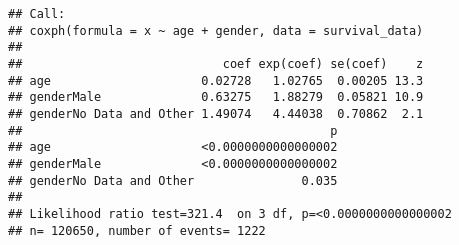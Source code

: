 \documentclass[]{article}
\newenvironment{Shaded}{\begin{snugshade}}{\end{snugshade}}
\newcommand{\KeywordTok}[1]{\textcolor[rgb]{0.13,0.29,0.53}{\textbf{#1}}}
\newcommand{\DataTypeTok}[1]{\textcolor[rgb]{0.13,0.29,0.53}{#1}}
\newcommand{\StringTok}[1]{\textcolor[rgb]{0.31,0.60,0.02}{#1}}
\newcommand{\CommentTok}[1]{\textcolor[rgb]{0.56,0.35,0.01}{\textit{#1}}}
\newcommand{\ControlFlowTok}[1]{\textcolor[rgb]{0.13,0.29,0.53}{\textbf{#1}}}
\newcommand{\OperatorTok}[1]{\textcolor[rgb]{0.81,0.36,0.00}{\textbf{#1}}}
\newcommand{\NormalTok}[1]{#1}
\begin{document}
\begin{Shaded}
\end{Shaded}

\begin{verbatim}
## Call:
## coxph(formula = x ~ age + gender, data = survival_data)
## 
##                            coef exp(coef) se(coef)    z
## age                     0.02728   1.02765  0.00205 13.3
## genderMale              0.63275   1.88279  0.05821 10.9
## genderNo Data and Other 1.49074   4.44038  0.70862  2.1
##                                           p
## age                     <0.0000000000000002
## genderMale              <0.0000000000000002
## genderNo Data and Other               0.035
## 
## Likelihood ratio test=321.4  on 3 df, p=<0.0000000000000002
## n= 120650, number of events= 1222
\end{verbatim}

\begin{Shaded}
\end{Shaded}
\end{document}
